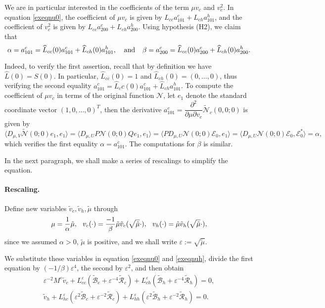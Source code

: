\documentclass[letterpaper,11pt]{article}
\newcommand{\eps}{\varepsilon}
\newcommand{\B}{\mathcal{B}}
\newcommand{\Rm}{\mathcal{R}}
\newcommand{\Nl}{\mathcal{N}}
\numberwithin{equation}{section}
\theoremstyle{plain}
\theoremstyle{remark}
\begin{document}
We are in particular interested in the coefficients of the term $\mu v_c$ and $v_c^2$. In equation \eqref{exeqnu0}, the coefficient of $\mu v_c$ is given by $L_{cc}a_{101}^c+L_{ch}a_{101}^h$, and the coefficient of $v_c^2$ is given by $L_{cc}a_{200}^c+L_{ch}a_{200}^h$. Using hypothesis (H2), we claim that
\[
\alpha = a_{101}^c =\widehat{L}_{cc}(0)a_{101}^c+\widehat{L}_{ch}(0)a_{101}^h , \hspace{0.1in}\text{ and }\hspace{0.1in}
\beta =a_{200}^c =\widehat{L}_{cc}(0)a_{200}^c+\widehat{L}_{ch}(0)a_{200}^h .
\]

Indeed, to verify the first assertion, recall that by definition we have $\widehat{L}(0) = S(0)$. In particular, 
$\widehat{L}_{cc}(0)=1$ and $\widehat{L}_{ch}(0)=(0,\ldots,0)$, thus verifying the second equality $a_{101}^c=\widehat{L}_cc(0)a_{101}^c+\widehat{L}_{ch}a_{101}^h$. 
To compute the coefficient of $\mu v_c$ in terms of the 
original function $\Nl$, let $e_1$ denote the standard coordinate vector $(1,0,\ldots,0)^T$, then the derivative 
$a_{101}^c=\dfrac{\partial^2}{\partial \mu \partial v_c}  \tilde{\Nl}_c(0,0;0)$ is given by
\[
\langle D_{\mu,V}\tilde{\Nl}(0;0)e_1,e_1\rangle=\langle D_{\mu,U} P\Nl(0;0)Q e_1,e_1\rangle = \langle PD_{\mu,U}\Nl(0;0) \mathcal{E}_0,e_1\rangle  = \langle D_{\mu,U}\Nl(0;0)\mathcal{E}_0,\mathcal{E}_0^*\rangle = \alpha,
\]
which verifies the first equality $\alpha=a_{101}^c$. The computations for $\beta$ is similar.

In the next paragraph, we shall make a series of rescalings to simplify the equation.

\paragraph{Rescaling.} Define new variables $\tilde{v}_c,\tilde{v}_h, \tilde{\mu}$ through 
\[
\mu=\frac{1}{\alpha}\tilde{\mu}, \hspace{0.1in} v_c(\cdot)=\frac{-1}{\beta}\tilde{\mu}\tilde{v}_c(\sqrt{\tilde{\mu}} \cdot), \hspace{0.1in} v_h(\cdot)=\tilde{\mu} \tilde{v}_h(\sqrt{\tilde{\mu}} \cdot),
\]
since we assumed $\alpha >0$, $\tilde{\mu}$ is positive, and we shall write $\eps := \sqrt{\tilde{\mu}}$.

We substitute these variables in equation \eqref{exeqnu0} and \eqref{exeqnuh}, divide the first equation by $(-1/\beta)\eps^4$, the second by $\eps^2$, and then obtain
\begin{align}
\eps^{-2}M^\eps \tilde{v}_c + L_{cc}^{\eps}(\tilde{\B}_c+\eps^{-4}\tilde{\Rm}_c) +L_{ch}^{\eps}(\tilde{\B}_h+\eps^{-4}\tilde{\Rm}_h) = 0,\label{rseqnu0}\\
\tilde{v}_h + L_{hc}^{\eps}(\eps^2\tilde{\B}_c+\eps^{-2}\tilde{\Rm}_c) +L_{hh}^{\eps}(\eps^2\tilde{\B}_h+\eps^{-2}\tilde{\Rm}_h)= 0. \label{rseqnuh}
\end{align}
\end{document}
